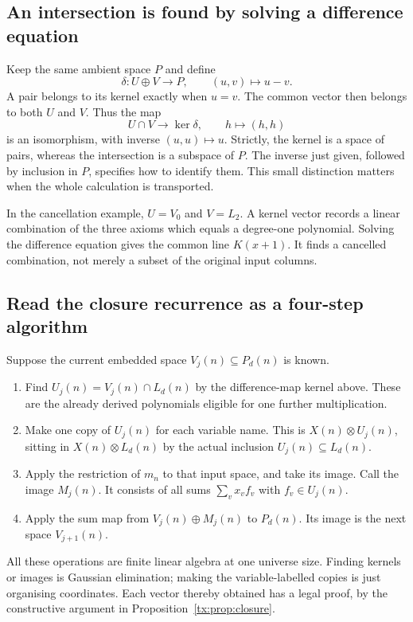 \subsection{An intersection is found by solving a difference equation}
Keep the same ambient space $P$ and define
\[
              \delta:U\oplus V\to P,\qquad(u,v)\mapsto u-v.
\]
A pair belongs to its kernel exactly when $u=v$. The common vector
then belongs to both $U$ and $V$. Thus the map
\[
                  U\cap V\longrightarrow\ker\delta,
                              \qquad h\mapsto(h,h)
\]
is an isomorphism, with inverse $(u,u)\mapsto u$.
Strictly, the kernel is a space of pairs, whereas the intersection
is a subspace of $P$. The inverse just given, followed by inclusion
in $P$, specifies how to identify them.
This small distinction matters when the whole calculation is transported.

In the cancellation example, $U=V_0$ and $V=L_2$.
A kernel vector records a linear combination of the three axioms
which equals a degree-one polynomial. Solving the difference equation
gives the common line $K(x+1)$. It finds a cancelled combination,
not merely a subset of the original input columns.

\subsection{Read the closure recurrence as a four-step algorithm}
Suppose the current embedded space $V_j(n)\subseteq P_d(n)$ is known.
\begin{enumerate}
\item Find $U_j(n)=V_j(n)\cap L_d(n)$ by the difference-map kernel
      above. These are the already derived polynomials eligible
      for one further multiplication.
\item Make one copy of $U_j(n)$ for each variable name.
      This is $X(n)\otimes U_j(n)$, sitting in
      $X(n)\otimes L_d(n)$ by the actual inclusion $U_j(n)\subseteq L_d(n)$.
\item Apply the restriction of $m_n$ to that input space, and take
      its image. Call the image $M_j(n)$. It consists of all sums
      $\sum_v x_vf_v$ with $f_v\in U_j(n)$.
\item Apply the sum map from $V_j(n)\oplus M_j(n)$ to $P_d(n)$.
      Its image is the next space $V_{j+1}(n)$.
\end{enumerate}
All these operations are finite linear algebra at one universe size.
Finding kernels or images is Gaussian elimination; making the
variable-labelled copies is just organising coordinates.
Each vector thereby obtained has a legal proof, by the constructive
argument in Proposition~\ref{tx:prop:closure}.

